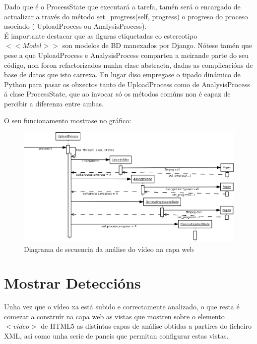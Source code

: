 		Dado que é o ProcessState que executará a tarefa, tamén será o encargado de actualizar
		a través do método set\_progress(self, progress) o progreso do proceso asociado (
		UploadProcess ou AnalysisProcess).\\
		
		É importante destacar que as figuras etiquetadas co estereotipo $<<Model>>$ son modelos 
		de BD manexados por Django. Nótese tamén que pese a que UploadProcess e AnalysisProcess
		comparten a meirande parte do seu código, non foron refactorizados nunha clase abstracta,
		dadas as complicacións de base de datos que isto carrexa. En lugar diso empregase o 
		tipado dinámico de Python para pasar os obxectos tanto de UploadProcess como de 
		AnalysisProcess á clase ProcessState, que ao invocar só os métodos comúns non é capaz de 
		percibir a diferenza
		entre ambas.
		
		O seu funcionamento mostrase no gráfico:
		
		\begin{figure}[htp]
		\begin{center}
			\includegraphics[scale=0.3]{figures/AnaliseVideoWeb.png}
			\caption{Diagrama de secuencia da análise do vídeo na capa web}
		\label{fig:AnaliseVideoWeb}
		\end{center}
		\end{figure}

\section{Mostrar Deteccións}
	
	Unha vez que o vídeo xa está subido e correctamente analizado, o que resta é comezar a construír
	na capa web as vistas que mostren sobre o elemento $<video>$ de HTML5 as distintas capas de 
	análise obtidas a partires do ficheiro XML, así como unha serie de paneis que permitan 
	configurar estas vistas.
	

